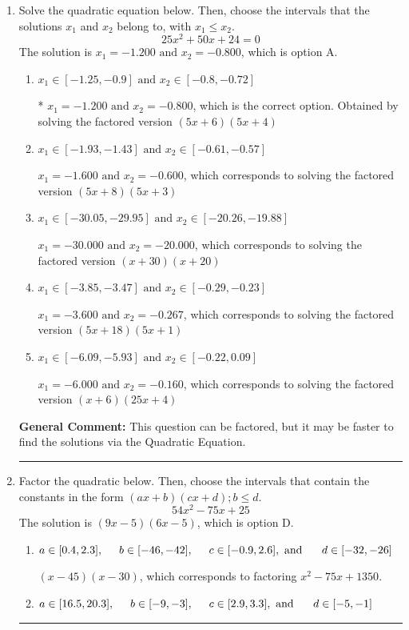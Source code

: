 \documentclass{extbook}[14pt]
\newcommand{\litem}[1]{\item #1

\rule{\textwidth}{0.4pt}}
\begin{document}
\begin{enumerate}\litem{
Solve the quadratic equation below. Then, choose the intervals that the solutions $x_1$ and $x_2$ belong to, with $x_1 \leq x_2$.
\[ 25x^{2} +50 x + 24 = 0 \]
The solution is \( x_1 = -1.200 \text{ and } x_2 = -0.800 \), which is option A.\begin{enumerate}[label=\Alph*.]
\item \( x_1 \in [-1.25, -0.9] \text{ and } x_2 \in [-0.8, -0.72] \)

* $x_1 = -1.200 \text{ and } x_2 = -0.800$, which is the correct option. Obtained by solving the factored version $(5x + 6)(5x + 4)$
\item \( x_1 \in [-1.93, -1.43] \text{ and } x_2 \in [-0.61, -0.57] \)

$x_1 = -1.600 \text{ and } x_2 = -0.600$, which corresponds to solving the factored version $(5x + 8)(5x + 3)$
\item \( x_1 \in [-30.05, -29.95] \text{ and } x_2 \in [-20.26, -19.88] \)

$x_1 = -30.000 \text{ and } x_2 = -20.000$, which corresponds to solving the factored version $(x + 30)(x + 20)$
\item \( x_1 \in [-3.85, -3.47] \text{ and } x_2 \in [-0.29, -0.23] \)

$x_1 = -3.600 \text{ and } x_2 = -0.267$, which corresponds to solving the factored version $(5x + 18)(5x + 1)$
\item \( x_1 \in [-6.09, -5.93] \text{ and } x_2 \in [-0.22, 0.09] \)

$x_1 = -6.000 \text{ and } x_2 = -0.160$, which corresponds to solving the factored version $(x + 6)(25x + 4)$
\end{enumerate}

\textbf{General Comment:} This question can be factored, but it may be faster to find the solutions via the Quadratic Equation.
}
\litem{
Factor the quadratic below. Then, choose the intervals that contain the constants in the form $(ax+b)(cx+d); b \leq d.$
\[ 54x^{2} -75 x + 25 \]
The solution is \( (9x -5)(6x -5) \), which is option D.\begin{enumerate}[label=\Alph*.]
\item \( a \in [0.4, 2.3], \hspace*{5mm} b \in [-46, -42], \hspace*{5mm} c \in [-0.9, 2.6], \text{ and } \hspace*{5mm} d \in [-32, -26] \)

 $(x -45)(x -30)$, which corresponds to factoring $x^{2} -75 x + 1350$.
\item \( a \in [16.5, 20.3], \hspace*{5mm} b \in [-9, -3], \hspace*{5mm} c \in [2.9, 3.3], \text{ and } \hspace*{5mm} d \in [-5, -1] \)


\end{enumerate}}
\end{enumerate}
\end{document}
